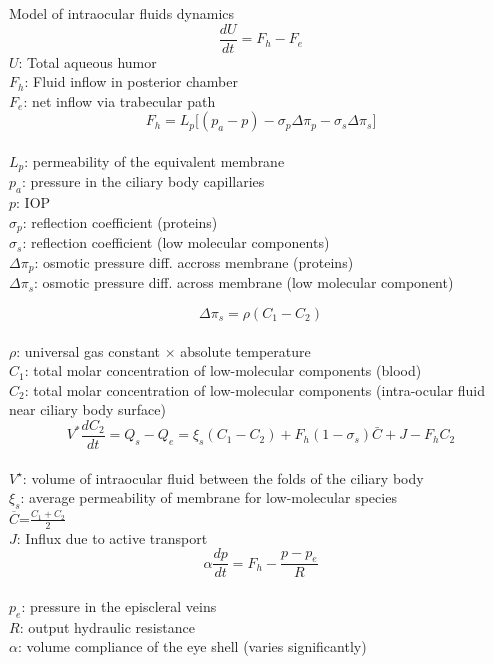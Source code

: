 \documentclass[9pt]{beamer}
\begin{document}
\begin{frame}{Model of intraocular fluids dynamics}
$$ \frac{dU}{dt}=F_{h}-F_{e}$$
$U$: Total aqueous humor\\
$F_h$: Fluid inflow in posterior chamber\\
$F_e$: net inflow via trabecular path
\newline
\\

$$F_{h}= L_p \big[ (p_a-p)-\sigma_{p} \Delta\pi_{p}-\sigma_{s} \Delta\pi_{s}\big]$$\\
$L_p$: permeability of the equivalent membrane\\
$p_a$: pressure in the ciliary body capillaries\\
$p$: IOP \\
$\sigma_p$: reflection coefficient (proteins)\\
$\sigma_s$: reflection coefficient (low molecular components)\\
$\Delta \pi_p $: osmotic pressure diff. accross membrane (proteins)\\
$\Delta \pi_s $: osmotic pressure diff. across membrane (low molecular component)
\newline
\\
\end{frame}
\begin{frame}
$$\Delta\pi_{s}= \rho(C_1-C_{2}) $$\\
$\rho$: universal gas constant $\times$  absolute temperature\\
$C_1$: total molar concentration of low-molecular components (blood)\\
$C_2$: total molar concentration of low-molecular components (intra-ocular fluid near ciliary body surface) 
\newline
\\
$$ V^{\ast} \frac{dC_{2}}{dt}= Q_s-Q_e=\xi_s(C_1-C_{2})+F_h (1-\sigma_s) \bar{C}+J-F_h C_2$$\\
$V^\star$: volume of intraocular fluid between the folds of the ciliary body\\
$\xi_s$: average permeability of membrane for low-molecular species\\
$\overline{C}$=$\displaystyle{\frac{C_1+C_2}{2}}$\\
$J$: Influx due to active transport
\newline
\\
$$ \alpha \frac{dp}{dt}=F_{h}-\frac{p-p_e}{R}$$\\
$p_e$: pressure in the episcleral veins\\
$R$: output hydraulic resistance\\
$\alpha$: volume compliance of the eye shell (varies significantly)
\newline
\\
\end{frame}
\end{document}
